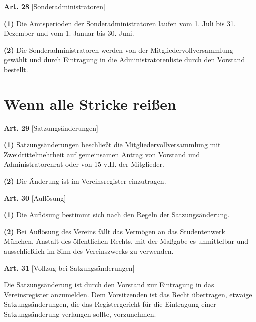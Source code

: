 \documentclass[12pt]{article}
\newcommand{\Abschnitt}[1]{\section{#1}}
\newcommand{\Satz}[2]{

\begin{samepage}
{\bf (#1)} #2
\end{samepage}
}
\newenvironment{Artikel}[2]{
\bigskip \centerline{{\bf Art. #1} [#2]}
\nopagebreak
}{
}
\begin{document}
\begin{Artikel}{28}{Sonderadministratoren}

\Satz{1}{Die Amtsperioden der Sonderadministratoren laufen vom 1. Juli bis 31. Dezember und vom 1. Januar bis 30. Juni.}

\Satz{2}{Die Sonderadministratoren werden von der Mitgliedervollversammlung ge\-wählt und durch Eintragung in die Administratorenliste durch den Vorstand bestellt.}

\end{Artikel}


\Abschnitt{Wenn alle Stricke reißen}

\begin{Artikel}{29}{Satzungsänderungen}

\Satz{1}{Satzungsänderungen beschließt die Mitgliedervollversammlung mit Zweidrittelmehrheit auf gemeinsamen Antrag von Vorstand und Administratorenrat oder von 15 v.H. der Mitglieder.}

\Satz{2}{Die Änderung ist im Vereinsregister einzutragen.}

\end{Artikel}

\begin{Artikel}{30}{Auflösung}

\Satz{1}{Die Auflösung bestimmt sich nach den Regeln der Satzungsänderung.}

\Satz{2}{Bei Auflösung des Vereins fällt das Vermögen an das Studentenwerk München, Anstalt des öffentlichen Rechts, mit der Maßgabe es unmittelbar und ausschließlich im Sinn des Vereinszwecks zu verwenden.}

\end{Artikel}

\begin{Artikel}{31}{Vollzug bei Satzungsänderungen}

Die Satzungsänderung ist durch den Vorstand zur Eintragung in das Vereinsregister anzumelden.
Dem Vorsitzenden ist das Recht übertragen, etwaige Satzungsänderungen, die das Registergericht für die Eintragung einer Satzungsänderung verlangen sollte, vorzunehmen.

\end{Artikel}
\end{document}
